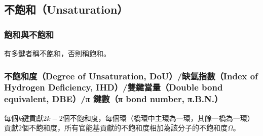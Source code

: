 \documentclass[a4paper,12pt]{report}
\begin{document}
\subsection{不飽和（Unsaturation）}
\subsubsection{飽和與不飽和}
有多鍵者稱不飽和，否則稱飽和。
\subsubsection{不飽和度（Degree of Unsaturation, DoU）/缺氫指數（Index of Hydrogen Deficiency, IHD）/雙鍵當量（Double bond equivalent, DBE）/π 鍵數（π bond number, π.B.N.）}
每個$k$鍵貢獻$2k-2$個不飽和度，每個環（橋環中主環為一環，其餘一橋為一環）貢獻$2$個不飽和度，所有官能基貢獻的不飽和度相加為該分子的不飽和度$\Omega$。
\end{document}
